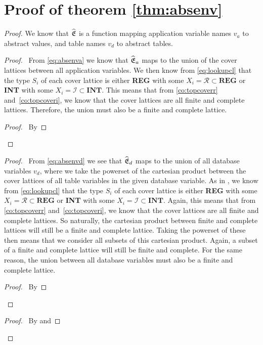 \section{Proof of theorem \ref{thm:absenv}}

\absenv*

\begin{proof}
   We know that $\widehat{\mathfrak{E}}$ is a function mapping application variable names $v_a$ to abstract values, and table names $v_d$ to abstract tables.
    \begin{proof}
        \pf\ From \autoref{eq:absenva} we know that $\widehat{\mathfrak{E}}_a$ maps to the union of the cover lattices between all application variables.
        We then know from \autoref{eq:lookupcl} that the type $S_i$ of each cover lattice is either \textbf{REG} with some $X_i=\mathcal{R}\subset\textbf{REG}$ or \textbf{INT} with some $X_i=\mathcal{I}\subset\textbf{INT}$.
        This means that from \autoref{co:topcoverr} and~\ref{co:topcoveri}, we know that the cover lattices are all finite and complete lattices.
        Therefore, the union must also be a finite and complete lattice.
        \qedstep
        \begin{proof}
            \pf\ By 
        \end{proof}
    \end{proof}
    \begin{proof}
        \pf\ From \autoref{eq:absenvd} we see that $\widehat{\mathfrak{E}}_d$ maps to the union of all database variables $v_d$, where we take the powerset of the cartesian product between the cover lattices of all table variables in the given database variable.
        As in , we know from \autoref{eq:lookupcl} that the type $S_i$ of each cover lattice is either \textbf{REG} with some $X_i=\mathcal{R}\subset\textbf{REG}$ or \textbf{INT} with some $X_i=\mathcal{I}\subset\textbf{INT}$.
        Again, this means that from \autoref{co:topcoverr} and~\ref{co:topcoveri}, we know that the cover lattices are all finite and complete lattices.
        So naturally, the cartesian product between finite and complete lattices will still be a finite and complete lattice.
        Taking the powerset of these then means that we consider all subsets of this cartesian product.
        Again, a subset of a finite and complete lattice will still be finite and complete.
        For the same reason, the union between all database variables must also be a finite and complete lattice.
        \qedstep
        \begin{proof}
            \pf\ By 
        \end{proof}
    \end{proof}
    \qedstep
    \begin{proof}
        \pf\ By  and 
    \end{proof}
\end{proof}
